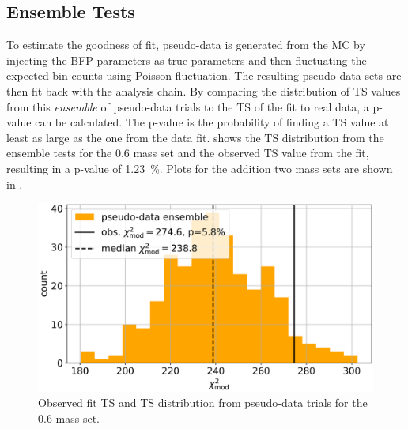 


\subsection{Ensemble Tests} 

To estimate the goodness of fit, pseudo-data is generated from the MC by injecting the BFP parameters as true parameters and then fluctuating the expected bin counts using Poisson fluctuation. The resulting pseudo-data sets are then fit back with the analysis chain. By comparing the distribution of TS values from this \textit{ensemble} of pseudo-data trials to the TS of the fit to real data, a p-value can be calculated. The p-value is the probability of finding a TS value at least as large as the one from the data fit.  shows the TS distribution from the ensemble tests for the \SI{0.6}{\gev} mass set and the observed TS value from the fit, resulting in a p-value of \SI{1.23}{\percent}. Plots for the addition two mass sets are shown in .

\begin{figure}[h]
    \includegraphics{figures/results/checks/full_blind_fit_0.6_GeV_step_3_4-1.png}
	\caption[Pseudo-data trials TS distribution (\SI{0.6}{\gev})]{Observed fit TS and TS distribution from pseudo-data trials for the \SI{0.6}{\gev} mass set.}
\end{figure}


